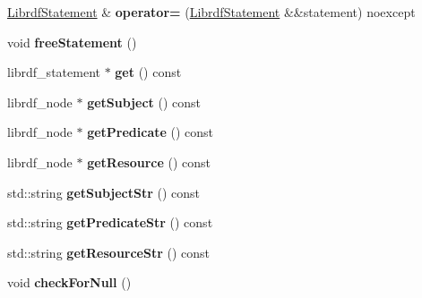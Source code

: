 \begin{DoxyCompactItemize}
\hyperlink{classredland_1_1LibrdfStatement}{Librdf\+Statement} \& {\bfseries operator=} (\hyperlink{classredland_1_1LibrdfStatement}{Librdf\+Statement} \&\&statement) noexcept
\item 
\mbox{\label{classredland_1_1LibrdfStatement_aa51bc647bc938a07bd6c16b4d6ce07b4}} 
void {\bfseries free\+Statement} ()
\item 
\mbox{\label{classredland_1_1LibrdfStatement_a6b655a56f37dbe95fec840a0a1f0ed53}} 
librdf\+\_\+statement $\ast$ {\bfseries get} () const
\item 
\mbox{\label{classredland_1_1LibrdfStatement_abcf022b8e24a74282e1d059fdf54d3fe}} 
librdf\+\_\+node $\ast$ {\bfseries get\+Subject} () const
\item 
\mbox{\label{classredland_1_1LibrdfStatement_a5aae51ac0994552a13f2c9b90bec63d0}} 
librdf\+\_\+node $\ast$ {\bfseries get\+Predicate} () const
\item 
\mbox{\label{classredland_1_1LibrdfStatement_aa763688f20b712ddc655afe405d7691a}} 
librdf\+\_\+node $\ast$ {\bfseries get\+Resource} () const
\item 
\mbox{\label{classredland_1_1LibrdfStatement_a6feed51cdebe7c4f2430fcba0ae17f37}} 
std\+::string {\bfseries get\+Subject\+Str} () const
\item 
\mbox{\label{classredland_1_1LibrdfStatement_a5dd0d6a2e9fe1bfcf5254aa7928cdfaf}} 
std\+::string {\bfseries get\+Predicate\+Str} () const
\item 
\mbox{\label{classredland_1_1LibrdfStatement_adc21321df7ccf186c262e83a4438e993}} 
std\+::string {\bfseries get\+Resource\+Str} () const
\item 
\mbox{\label{classredland_1_1LibrdfStatement_a700219b2fed175a96fecfbd905d20ab1}} 
void {\bfseries check\+For\+Null} ()
\item 
\mbox{\label{classredland_1_1LibrdfStatement_a5fa27f77859a4673e991b9e86f84d889}} 

\end{DoxyCompactItemize}
